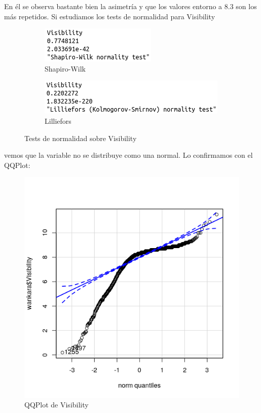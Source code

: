En él se observa bastante bien la asimetría y que los valores entorno a 8.3 son los más repetidos. Si estudiamos los tests de normalidad para Visibility

\begin{figure}[H]
	\centering
	\begin{subfigure}{.5\textwidth}
		\centering
		\includegraphics[width=.7\linewidth]{shapiro-vis.png}
		\caption{Shapiro-Wilk}
		\label{fig:sw-vis}
	\end{subfigure}%
	\begin{subfigure}{.5\textwidth}
		\centering
		\includegraphics[width=.7\linewidth]{lillie-vis.png}	\caption{Lilliefors}
		\label{fig:l-vis}
	\end{subfigure}
	\caption{Tests de normalidad sobre Visibility}
	\label{fig:norm-vis}
\end{figure}

vemos que la variable no se distribuye como una normal. Lo confirmamos con el QQPlot:

\begin{figure}[H] %
	\centering
	\includegraphics[scale=0.7]{qq-vis.png}  %
	\caption{QQPlot de Visibility} 
	\label{fig:qq-vis}
\end{figure}

